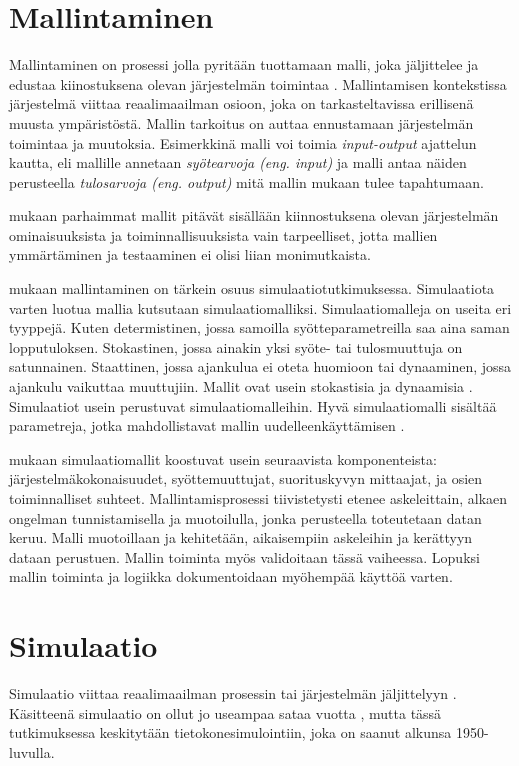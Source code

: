 \documentclass[utf8]{gradu3}
\begin{document}
\section{Mallintaminen} \label{mallintaminen}
Mallintaminen on prosessi jolla pyritään tuottamaan malli, joka jäljittelee 
ja edustaa kiinostuksena olevan järjestelmän toimintaa \parencite{maria1997introduction}. 
Mallintamisen kontekstissa järjestelmä viittaa reaalimaailman osioon, 
joka on tarkasteltavissa erillisenä muusta ympäristöstä.
Mallin tarkoitus on auttaa ennustamaan järjestelmän toimintaa ja muutoksia.
Esimerkkinä malli voi toimia \textit{input-output} ajattelun kautta, 
eli mallille annetaan \textit{syötearvoja (eng. input)} ja malli antaa näiden perusteella
\textit{tulosarvoja (eng. output)} mitä mallin mukaan tulee tapahtumaan.

\textcite{maria1997introduction} mukaan parhaimmat mallit pitävät 
sisällään kiinnostuksena olevan järjestelmän 
ominaisuuksista ja toiminnallisuuksista vain tarpeelliset, 
jotta mallien ymmärtäminen ja testaaminen ei olisi liian monimutkaista.

\textcite{maria1997introduction} mukaan mallintaminen on tärkein osuus simulaatiotutkimuksessa.
Simulaatiota varten luotua mallia kutsutaan simulaatiomalliksi.
Simulaatiomalleja on useita eri tyyppejä. 
Kuten determistinen, jossa samoilla syötteparametreilla saa aina saman lopputuloksen. 
Stokastinen, jossa ainakin yksi syöte- tai tulosmuuttuja on satunnainen. 
Staattinen, jossa ajankulua ei oteta huomioon tai dynaaminen, 
jossa ajankulu vaikuttaa muuttujiin. Mallit ovat usein stokastisia ja dynaamisia \parencite{maria1997introduction}. 
Simulaatiot usein perustuvat simulaatiomalleihin. 
Hyvä simulaatiomalli sisältää parametreja,
jotka mahdollistavat mallin uudelleenkäyttämisen \parencite{introduction2005simulation}. 

\textcite{maria1997introduction} mukaan simulaatiomallit koostuvat usein seuraavista komponenteista: järjestelmäkokonaisuudet, syöttemuuttujat, suorituskyvyn mittaajat,
ja osien toiminnalliset suhteet. Mallintamisprosessi tiivistetysti etenee askeleittain, alkaen ongelman tunnistamisella ja muotoilulla, 
jonka perusteella toteutetaan datan keruu. Malli muotoillaan ja kehitetään, 
aikaisempiin askeleihin ja kerättyyn dataan perustuen. Mallin toiminta myös validoitaan tässä vaiheessa. 
Lopuksi mallin toiminta ja logiikka dokumentoidaan myöhempää käyttöä varten.

\section{Simulaatio} \label{simulaatio}
Simulaatio viittaa reaalimaailman prosessin tai 
järjestelmän jäljittelyyn \parencite{banks1999introduction}. 
Käsitteenä simulaatio on ollut jo useampaa sataa vuotta 
\parencite{HistoryOfSimulation}, 
mutta tässä tutkimuksessa keskitytään tietokonesimulointiin, 
joka on saanut alkunsa 1950-luvulla. 
%
\parencites%
    {HistoryOfSimulation}%
    {historyOfSimulation1996}
\relax
\end{document}
